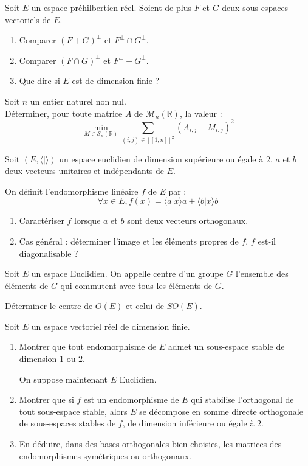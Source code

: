 \begin{exer}
Soit $E$ un espace pr\'ehilbertien r\'eel. Soient de plus $F$ et $G$ deux sous-espaces vectoriels de $E$.
\begin{enumerate}
\item Comparer $(F+G)^{\perp}$ et $F^{\perp}\cap G^{\perp}$.
\item Comparer $(F\cap G)^{\perp}$ et $F^{\perp}+G^{\perp}$.
\item Que dire si $E$ est de dimension finie ?
\end{enumerate}
\end{exer}

\begin{exer}
Soit $n$ un entier naturel non nul.\\
D\'eterminer, pour toute matrice $A$ de $\mathcal{M}_n(\mathbb{R})$, la valeur :
\[\underset{M\in\mathcal{S}_n(\mathbb{R})}{\min}\sum\limits_{(i,j)\in [\![1,n]\!]^2} (A_{i,j}-M_{i,j})^2\]
\end{exer}

\begin{exer}
Soit $(E,\langle |\rangle )$ un espace euclidien de dimension sup\'erieure ou \'egale \`a $2$, $a$ et $b$ deux vecteurs unitaires et ind\'ependants de $E$.

On d\'efinit l'endomorphisme lin\'eaire $f$ de $E$ par :\[\forall x \in E, f(x)=\langle a|x\rangle a+\langle b|x \rangle b\]
\begin{enumerate}
\item Caract\'eriser $f$ lorsque $a$ et $b$ sont deux vecteurs orthogonaux.
\item Cas g\'en\'eral : d\'eterminer l'image et les \'el\'ements propres de $f$. $f$ est-il diagonalisable ?
\end{enumerate}
\end{exer}

\begin{exer}
Soit $E$ un espace Euclidien. %
On appelle centre d'un groupe $G$ l'ensemble des éléments de $G$ qui commutent avec tous les éléments de $G$.

D\'eterminer le centre de $O(E)$ et celui de $SO(E)$.
\end{exer}

\begin{exer}
Soit $E$ un espace vectoriel réel de dimension finie.
\begin{enumerate}
\item Montrer que tout endomorphisme de $E$ admet un sous-espace stable de dimension $1$ ou $2$.

\smallskip
On suppose maintenant $E$ Euclidien.
\item Montrer que si $f$ est un endomorphisme de $E$ qui stabilise l'orthogonal de tout sous-espace stable, alors $E$ se décompose en somme directe orthogonale de sous-espaces stables de $f$, de dimension inférieure ou égale à $2$.
\item En déduire, dans des bases orthogonales bien choisies, les matrices des endomorphismes symétriques ou orthogonaux.%
\end{enumerate}
\end{exer}

